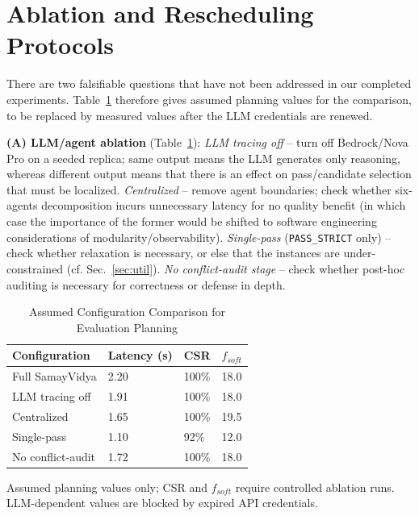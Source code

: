 \documentclass[conference]{IEEEtran}
\begin{document}
\section{Ablation and Rescheduling Protocols}
\label{sec:ablation}
There are two falsifiable questions that have not been addressed in our completed experiments. Table~\ref{tab:ablation} therefore gives assumed planning values for the comparison, to be replaced by measured values after the LLM credentials are renewed.

\textbf{(A) LLM/agent ablation} (Table~\ref{tab:ablation}): \emph{LLM tracing off} -- turn off Bedrock/Nova Pro on a seeded replica; same output means the LLM generates only reasoning, whereas different output means that there is an effect on pass/candidate selection that must be localized. \emph{Centralized} -- remove agent boundaries; check whether six-agents decomposition incurs unnecessary latency for no quality benefit (in which case the importance of the former would be shifted to software engineering considerations of modularity/observability). \emph{Single-pass} (\texttt{PASS\_STRICT} only) -- check whether relaxation is necessary, or else that the instances are under-constrained (cf. Sec.~\ref{sec:util}). \emph{No conflict-audit stage} -- check whether post-hoc auditing is necessary for correctness or defense in depth.

\begin{table}[t]
\caption{Assumed Configuration Comparison for Evaluation Planning}
\label{tab:ablation}
\centering
\footnotesize
\renewcommand{\arraystretch}{1.15}
\begin{tabular}{p{2.3cm}p{1.0cm}p{0.9cm}p{0.9cm}}
\toprule
\textbf{Configuration} & \textbf{Latency (s)} & \textbf{CSR} & \textbf{$f_{soft}$} \\
\midrule
Full SamayVidya & 2.20 & 100\% & 18.0 \\
LLM tracing off & 1.91 & 100\% & 18.0 \\
Centralized & 1.65 & 100\% & 19.5 \\
Single-pass & 1.10 & 92\% & 12.0 \\
No conflict-audit & 1.72 & 100\% & 18.0 \\
\bottomrule
\end{tabular}
\par\footnotesize{Assumed planning values only; CSR and $f_{soft}$ require controlled ablation runs. LLM-dependent values are blocked by expired API credentials.}
\end{table}
\end{document}

